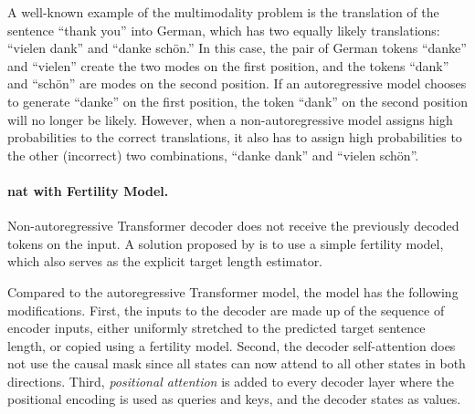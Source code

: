 


A well-known example of the multimodality problem is the translation of the
sentence ``thank you'' into German, which has two equally likely translations:
``vielen dank'' and ``danke schön.'' In this case, the pair of German tokens
``danke'' and ``vielen'' create the two modes on the first position, and the
tokens ``dank'' and ``schön'' are modes on the second position. If an
autoregressive model chooses to generate ``danke'' on the first position, the
token ``dank'' on the second position will no longer be likely. However, when a
non-autoregressive model assigns high probabilities to the correct
translations, it also has to assign high probabilities to the other (incorrect)
two combinations, ``danke dank'' and ``vielen schön''.

\paragraph{\Ac{nat} with Fertility Model.} Non-autoregressive Transformer
decoder does not receive the previously decoded tokens on the input. A solution
proposed by \citet{gu2017nonautoregressive} is to use a simple fertility model,
which also serves as the explicit target length estimator.

Compared to the autoregressive Transformer model, the model has the following
modifications. First, the inputs to the decoder are made up of the sequence of
encoder inputs, either uniformly stretched to the predicted target sentence
length, or copied using a fertility model. Second, the decoder self-attention
does not use the causal mask since all states can now attend to all other states
in both directions. Third, \emph{positional attention} is added to every decoder
layer where the positional encoding is used as queries and keys, and the decoder
states as values.

